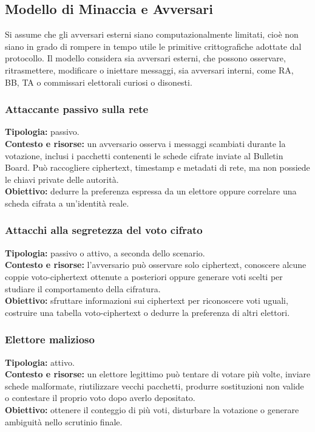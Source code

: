 \documentclass[12pt,a4paper]{article}
\begin{document}
\subsection{Modello di Minaccia e Avversari}

Si assume che gli avversari esterni siano computazionalmente limitati, cio\`e non siano in grado di rompere in tempo utile le primitive crittografiche adottate dal protocollo. Il modello considera sia avversari esterni, che possono osservare, ritrasmettere, modificare o iniettare messaggi, sia avversari interni, come RA, BB, TA o commissari elettorali curiosi o disonesti.

\subsubsection*{Attaccante passivo sulla rete}
\textbf{Tipologia:} passivo.\\
\textbf{Contesto e risorse:} un avversario osserva i messaggi scambiati durante la votazione, inclusi i pacchetti contenenti le schede cifrate inviate al Bulletin Board. Pu\`o raccogliere ciphertext, timestamp e metadati di rete, ma non possiede le chiavi private delle autorit\`a.\\
\textbf{Obiettivo:} dedurre la preferenza espressa da un elettore oppure correlare una scheda cifrata a un'identit\`a reale.\\


\subsubsection*{Attacchi alla segretezza del voto cifrato}
\textbf{Tipologia:} passivo o attivo, a seconda dello scenario.\\
\textbf{Contesto e risorse:} l'avversario pu\`o osservare solo ciphertext, conoscere alcune coppie voto-ciphertext ottenute a posteriori oppure generare voti scelti per studiare il comportamento della cifratura.\\
\textbf{Obiettivo:} sfruttare informazioni sui ciphertext per riconoscere voti uguali, costruire una tabella voto-ciphertext o dedurre la preferenza di altri elettori.\\


\subsubsection*{Elettore malizioso}
\textbf{Tipologia:} attivo.\\
\textbf{Contesto e risorse:} un elettore legittimo pu\`o tentare di votare pi\`u volte, inviare schede malformate, riutilizzare vecchi pacchetti, produrre sostituzioni non valide o contestare il proprio voto dopo averlo depositato.\\
\textbf{Obiettivo:} ottenere il conteggio di pi\`u voti, disturbare la votazione o generare ambiguit\`a nello scrutinio finale.\\
\end{document}
